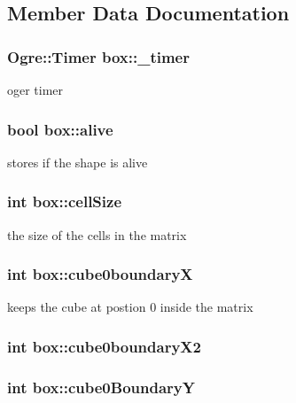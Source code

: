 \subsection{Member Data Documentation}
\hypertarget{classbox_aa8731a3a737a73831f093b550e28f4a3}{
\subsubsection[{\-\_\-timer}]{\setlength{\rightskip}{0pt plus 5cm}Ogre\-::\-Timer box\-::\-\_\-timer}}\label{classbox_aa8731a3a737a73831f093b550e28f4a3}
oger timer \hypertarget{classbox_ad8b435145432f780c4e056953e23e17f}{
\subsubsection[{alive}]{\setlength{\rightskip}{0pt plus 5cm}bool box\-::alive}}\label{classbox_ad8b435145432f780c4e056953e23e17f}
stores if the shape is alive \hypertarget{classbox_a96f4d4f2e59525807d053b6972a72441}{
\subsubsection[{cell\-Size}]{\setlength{\rightskip}{0pt plus 5cm}int box\-::cell\-Size}}\label{classbox_a96f4d4f2e59525807d053b6972a72441}
the size of the cells in the matrix \hypertarget{classbox_aece931ab7a442ce512195e62d425f003}{
\subsubsection[{cube0boundary\-X}]{\setlength{\rightskip}{0pt plus 5cm}int box\-::cube0boundary\-X}}\label{classbox_aece931ab7a442ce512195e62d425f003}
keeps the cube at postion 0 inside the matrix \hypertarget{classbox_ac537ee9d62e0ce4d2547abf71e162ecc}{
\subsubsection[{cube0boundary\-X2}]{\setlength{\rightskip}{0pt plus 5cm}int box\-::cube0boundary\-X2}}\label{classbox_ac537ee9d62e0ce4d2547abf71e162ecc}
\hypertarget{classbox_a9e1a485f4294e148ae46da563fb59405}{
\subsubsection[{cube0\-Boundary\-Y}]{\setlength{\rightskip}{0pt plus 5cm}int box\-::cube0\-Boundary\-Y}}\label{classbox_a9e1a485f4294e148ae46da563fb59405}
